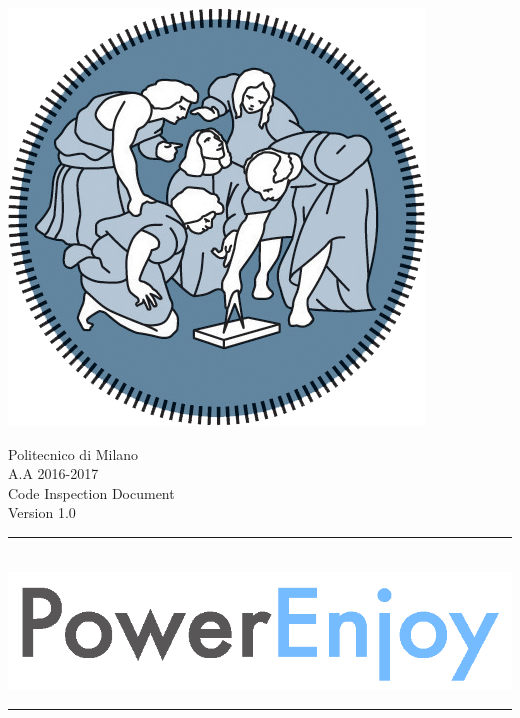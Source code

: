 \documentclass[12pt]{article}
\begin{document}
   
	\begin{center}
 	 	\includegraphics[scale=1.5]{Images/PolimiLogo.png}
	\end{center}

	\begin{center}
	 	{\Huge Politecnico di Milano}\\
	 	\vspace{5mm}
		{\Large A.A 2016-2017} 
		\vspace{5mm}\\
		{\huge Code Inspection Document}   
		\vspace{5mm}\\
		{\large Version 1.0}  
    \end{center}
     
    \begin{center}
		\noindent\rule{8cm}{0.8pt}
		 \vspace{5mm}\\
 	 	 \includegraphics[scale=1]{Images/logoPowerEnjoy2.png}\\
		\noindent\rule{8cm}{0.8pt}
	\end{center}
	 	\vspace{5mm}
	 		
\end{document}
